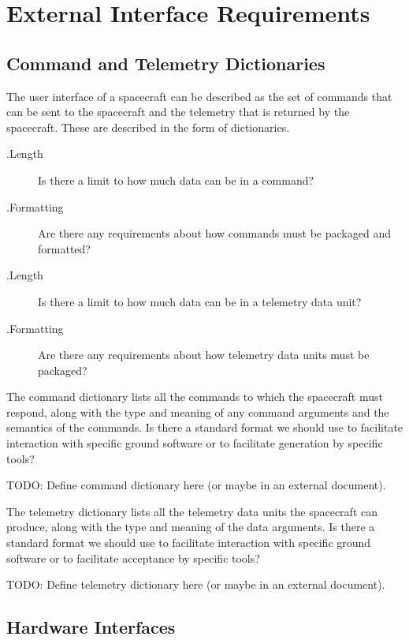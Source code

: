 \chapter{External Interface Requirements}
\section{Command and Telemetry Dictionaries}
The user interface of a spacecraft can be described as the set of
commands that can be sent to the spacecraft and the telemetry that is
returned by the spacecraft. These are described in the form of
dictionaries.

\begin{description}
\item[{\varcmd}.Length] Is there a limit to how much data can be in a
  command?
\item[{\varcmd}.Formatting] Are there any requirements about how
  commands must be packaged and formatted?
\item[{\vartelem}.Length] Is there a limit to how much data can be in
  a telemetry data unit?
\item[{\vartelem}.Formatting] Are there any requirements about how
  telemetry data units must be packaged?
\end{description}

The command dictionary lists all the commands to which the spacecraft
must respond, along with the type and meaning of any command arguments
and the semantics of the commands. Is there a standard format we
should use to facilitate interaction with specific ground software or
to facilitate generation by specific tools?

TODO: Define command dictionary here (or maybe in an external
document).

The telemetry dictionary lists all the telemetry data units the
spacecraft can produce, along with the type and meaning of the data
arguments. Is there a standard format we should use to facilitate
interaction with specific ground software or to facilitate acceptance
by specific tools?

TODO: Define telemetry dictionary here (or maybe in an external
document).

\section{Hardware Interfaces}

